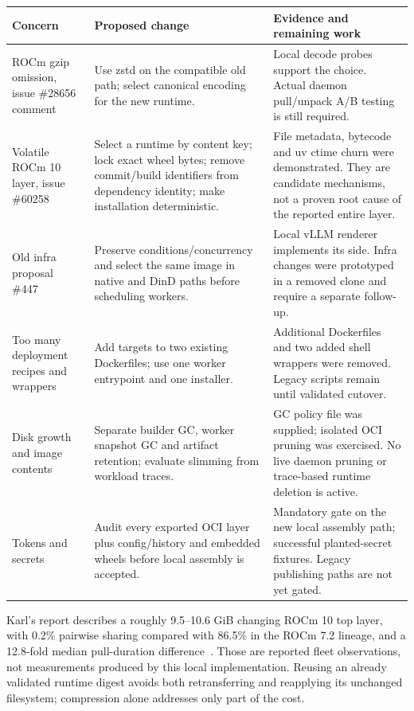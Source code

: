 \documentclass[11pt,a4paper]{article}
\begin{document}
\begin{longtable}{L{31mm}L{57mm}L{60mm}}
\toprule
Concern & Proposed change & Evidence and remaining work \\
\midrule
\endhead
ROCm gzip omission, issue \#28656 comment~\cite{compressionissue} & Use zstd
on the compatible old path; select canonical encoding for the new runtime. &
Local decode probes support the choice. Actual daemon pull/unpack A/B testing
is still required. \\
Volatile ROCm 10 layer, issue \#60258~\cite{karl} & Select a runtime by content
key; lock exact wheel bytes; remove commit/build identifiers from dependency
identity; make installation deterministic. & File metadata, bytecode and uv
ctime churn were demonstrated. They are candidate mechanisms, not a proven
root cause of the reported entire layer. \\
Old infra proposal \#447~\cite{infra} & Preserve conditions/concurrency and
select the same image in native and DinD paths before scheduling workers. &
Local vLLM renderer implements its side. Infra changes were prototyped in a
removed clone and require a separate follow-up. \\
Too many deployment recipes and wrappers & Add targets to two existing
Dockerfiles; use one worker entrypoint and one installer. & Additional
Dockerfiles and two added shell wrappers were removed. Legacy scripts remain
until validated cutover. \\
Disk growth and image contents & Separate builder GC, worker snapshot GC and
artifact retention; evaluate slimming from workload traces. & GC policy file
was supplied; isolated OCI pruning was exercised. No live daemon pruning or trace-based
runtime deletion is active. \\
Tokens and secrets & Audit every exported OCI layer plus config/history and
embedded wheels before local assembly is accepted. & Mandatory gate on the new
local assembly path; successful planted-secret fixtures. Legacy publishing paths
are not yet gated. \\
\bottomrule
\end{longtable}

Karl's report describes a roughly 9.5--10.6 GiB changing ROCm 10 top layer, with
0.2\% pairwise sharing compared with 86.5\% in the ROCm 7.2 lineage, and a
12.8-fold median pull-duration difference~\cite{karl}. Those are reported fleet
observations, not measurements produced by this local implementation.
Reusing an already validated runtime digest avoids both retransferring and
reapplying its unchanged filesystem; compression alone addresses only part of
the cost.
\end{document}

